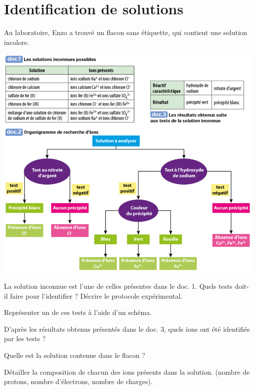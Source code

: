 \section{Identification de solutions}

Au laboratoire, Enzo a trouvé un flacon sans étiquette, qui contient une solution incolore. 

\begin{center}
	\includegraphics[scale=0.6]{img/docs}
\end{center}

\begin{questions}
	\question La solution inconnue est l'une de celles présentes dans le doc. 1. Quels tests doit-il faire pour l'identifier ? Décrire le protocole expérimental.
	
	\question Représenter un de ces tests à l'aide d'un schéma.
	
	\question D'après les résultats obtenus présentés dans le doc. 3, quels ions ont été identifiés par les tests ? 
	
	\question Quelle est la solution contenue dans le flacon ?
	
	\question Détailler la composition de chacun des ions présents dans la solution. (nombre de protons, nombre d'électrons, nombre de charges).
	
	
\end{questions}